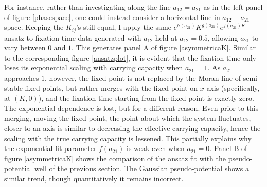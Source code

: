 For instance, rather than investigating along the line $a_{12} = a_{21}$ as in the left panel of figure \ref{phasespace}, one could instead consider a horizontal line in $a_{12}-a_{21}$ space. 
Keeping the $K_{ij}$'s still equal, I apply the same $e^{h(a_{21})}K^{g(a_{21})}e^{f(a_{21})K}$ ansatz to fixation time data generated with $a_{12}$ held at $a_{12}=0.5$, allowing $a_{21}$ to vary between $0$ and $1$. 
This generates panel A of figure \ref{asymmetricaK}. %
Similar to the corresponding figure \ref{ansatzplot}, it is evident that the fixation time only loses its exponential scaling with carrying capacity when $a_{21}=1$. 
As $a_{21}$ approaches $1$, however, the fixed point is not replaced by the Moran line of semi-stable fixed points, but rather merges with the fixed point on $x$-axis (specifically, at $(K,0)$), and the fixation time starting from the fixed point is exactly zero. 
The exponential dependence is lost, but for a different reason. 
Even prior to this merging, moving the fixed point, the point about which the system fluctuates, closer to an axis is similar to decreasing the effective carrying capacity, hence the scaling with the true carrying capacity is lessened. 
This partially explains why the exponential fit parameter $f(a_{21})$ is weak even when $a_{21}=0$. 
Panel B of figure \ref{asymmetricaK} shows the comparison of the ansatz fit with the pseudo-potential well of the previous section. 
The Gaussian pseudo-potential shows a similar trend, though quantitatively it remains incorrect. 
\fi

